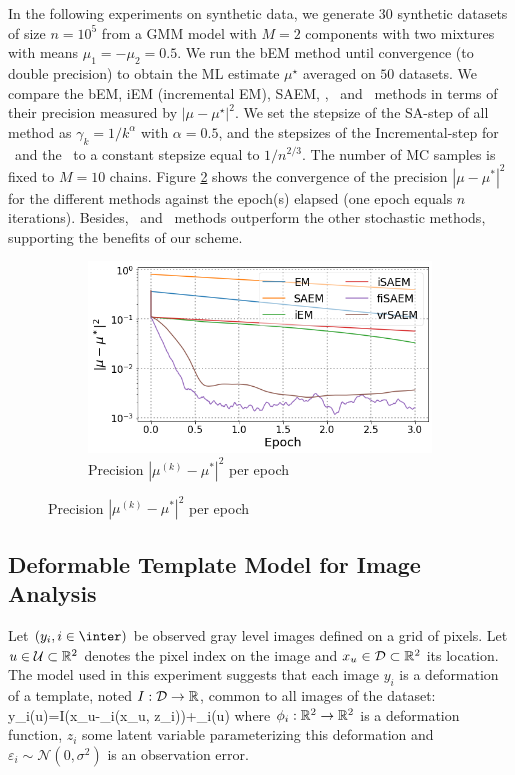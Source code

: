 \documentclass[11pt]{article}
\theoremstyle{t}
\begin{document}
In the following experiments on synthetic data, we generate $30$ synthetic datasets of size $n = 10^5$ from a GMM model with $M=2$ components with two mixtures with means $\mu_1 = - \mu_2 = 0.5$.
We run the bEM method until convergence (to double precision) to obtain the ML estimate $\mu^\star$ averaged on $50$ datasets. We compare the bEM, iEM (incremental EM), SAEM, \ISAEM, \SAEMVR\ and \FISAEM\ methods in terms of their precision measured by $| \mu - \mu^\star |^2$. 
We set the stepsize of the \textsf{SA-step} of all method as $\gamma_k = 1/k^{\alpha}$ with $\alpha = 0.5$, and the stepsizes of the \textsf{Incremental-step} for \SAEMVR\ and the \FISAEM\ to a constant stepsize equal to $1/n^{2/3}$. The number of MC samples is fixed to $M=10$ chains.
Figure \ref{fig:gmm_tts} shows the convergence of the precision $|\mu - \mu^*|^2$ for the different methods against the epoch(s) elapsed (one epoch equals $n$ iterations). Besides, \SAEMVR\ and \FISAEM\ methods outperform the other stochastic methods, supporting the benefits of our scheme.
\begin{figure}
\begin{minipage}{0.5\textwidth}
\begin{figure}[H]
\includegraphics[width=\textwidth]{pic_paper/tts_gmm_n100k.png}
\caption{Precision $|\mu^{(k)} - \mu^*|^2$ per epoch}
\label{fig:gmm_tts}
\end{figure}

\end{minipage}
\end{figure}




\subsection{Deformable Template Model for Image Analysis}
Let $(y_i, i \in \inter)$ be observed gray level images defined on a grid of pixels.
Let $u \in \mathcal{U} \subset \mathbb{R}^2$ denotes the pixel index on the image and $x_u \in \mathcal{D} \subset \mathbb{R}^2$ its location.
The model used in this experiment suggests that each image $y_i$ is a deformation of a template, noted $I: \mathcal{D} \to \mathbb{R}$, common to all images of the dataset:
\beq\label{eq:deformablemodel}
y_{i}(u)=I\left(x_{u}-\Phi_{i}\left(x_{u}, z_i\right)\right)+\varepsilon_{i}(u)
\eeq
where $\phi_i: \mathbb{R}^2 \to \mathbb{R}^2$ is a deformation function, $z_i$ some latent variable parameterizing this deformation and $\varepsilon_{i} \sim \mathcal{N}(0,\sigma^2)$ is an observation error.
\end{document}
